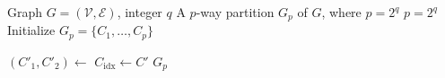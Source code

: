 \begin{algorithm}
    \caption{Recursive bisection.}
    \label{alg:recursive}
    \begin{algorithmic}[1]
    \Require Graph \( G = (\mathcal{V}, \mathcal{E})\), integer \(q\)
    \Ensure A \(p\)-way partition \(G_p\) of \(G\), where \(p=2^q\)
        \State \(p = 2^q\)
        \State Initialize \(G_p = \{C_1,\dots, C_p\}\)
        
                \State \(\left(C'_1, C'_2\right)\leftarrow \)
                \State {}
                \State {}
            \Else
                \State \(C_{\mathrm{idx}} \leftarrow C'\)
            \EndIf
        \EndFunction
         \State {}
         \State \Return \(G_p\)
    \EndFunction
    \end{algorithmic}
\end{algorithm}
